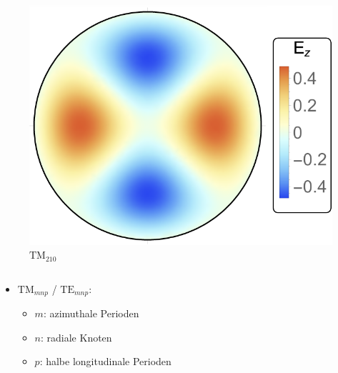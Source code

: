 \documentclass[12pt,xcolor=dvipsnames,professionalfonts]{beamer}
\begin{document}
\begin{frame}
\begin{columns}[T]
		\begin{figure}[h]
			\centering
			\hspace*{0.70cm}\includegraphics[scale=0.4]{./figures/tm210.pdf}
			\vspace*{-0.2cm}
			\caption{$\mathrm{TM}_{210}$}
		\end{figure}
	\end{columns}
	\vfill
	\begin{itemize}
		\item $\mathrm{TM}_{mnp}$ / $\mathrm{TE}_{mnp}$:
		\begin{itemize}
			\setlength\itemsep{0.25em}
			\item $m$: azimuthale Perioden
			\item $n$: radiale Knoten
			\item $p$: halbe longitudinale Perioden
		\end{itemize}
	\end{itemize}
\end{frame}
\end{document}
